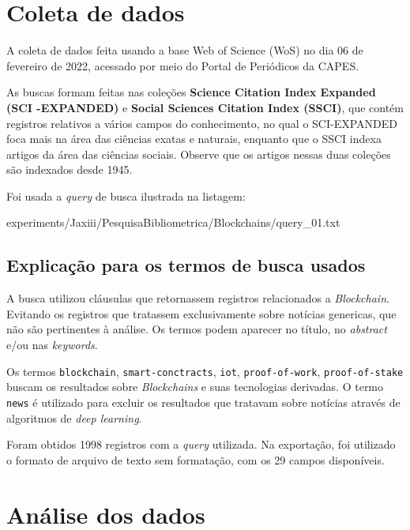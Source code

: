 \section{Coleta de dados\label{MASSA:coleta}}

A coleta de dados feita usando a base Web of Science (WoS) no dia 06 de fevereiro de 2022, acessado por meio do Portal de Periódicos da CAPES.

As buscas formam feitas nas coleções \textbf{Science  Citation  Index  Expanded (SCI -EXPANDED)} e \textbf{Social  Sciences  Citation  Index (SSCI)}, que contém registros relativos a vários campos do conhecimento, no qual o SCI-EXPANDED foca mais na área das ciências exatas e naturais, enquanto que o SSCI indexa artigos da área das ciências sociais. Observe que os artigos nessas duas coleções são indexados desde 1945. 

Foi usada a \textit{query} de busca ilustrada na listagem:


{experiments/Jaxiii/PesquisaBibliometrica/Blockchains/query_01.txt}

\subsection{Explicação para os termos de busca usados}

A busca utilizou cláusulas que retornassem registros relacionados a \textit{Blockchain}. Evitando os registros que tratassem exclusivamente sobre notícias genericas, que não são pertinentes à análise. Os termos podem aparecer no título, no \textit{abstract} e/ou nas \textit{keywords}. 

Os termos \texttt{blockchain}, \texttt{smart-conctracts}, \texttt{iot}, \texttt{proof-of-work}, \texttt{proof-of-stake} buscam os resultados sobre \textit{Blockchains} e suas tecnologias derivadas. O termo \texttt{news} é utilizado para excluir os resultados que tratavam sobre notícias através de algoritmos de \textit{deep learning}.

Foram obtidos 1998 registros com a \textit{query} utilizada. Na exportação, foi utilizado o formato de arquivo de texto sem formatação, com os 29 campos disponíveis.

\section{Análise dos dados}

